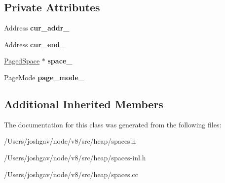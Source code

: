 \subsection*{Private Attributes}
\begin{DoxyCompactItemize}
\item 
Address {\bfseries cur\+\_\+addr\+\_\+}\hypertarget{classv8_1_1internal_1_1_heap_object_iterator_a3e323c7bdcfadd16b73f1e5f9bbefa38}{}\label{classv8_1_1internal_1_1_heap_object_iterator_a3e323c7bdcfadd16b73f1e5f9bbefa38}

\item 
Address {\bfseries cur\+\_\+end\+\_\+}\hypertarget{classv8_1_1internal_1_1_heap_object_iterator_a560cf531babdf39618105631d9c6b980}{}\label{classv8_1_1internal_1_1_heap_object_iterator_a560cf531babdf39618105631d9c6b980}

\item 
\hyperlink{classv8_1_1internal_1_1_paged_space}{Paged\+Space} $\ast$ {\bfseries space\+\_\+}\hypertarget{classv8_1_1internal_1_1_heap_object_iterator_a1e6debb8083b9994fe47565fbfbd170e}{}\label{classv8_1_1internal_1_1_heap_object_iterator_a1e6debb8083b9994fe47565fbfbd170e}

\item 
Page\+Mode {\bfseries page\+\_\+mode\+\_\+}\hypertarget{classv8_1_1internal_1_1_heap_object_iterator_a85289e54ac16f39216287ab9cf06c65a}{}\label{classv8_1_1internal_1_1_heap_object_iterator_a85289e54ac16f39216287ab9cf06c65a}

\end{DoxyCompactItemize}
\subsection*{Additional Inherited Members}


The documentation for this class was generated from the following files\+:\begin{DoxyCompactItemize}
\item 
/\+Users/joshgav/node/v8/src/heap/spaces.\+h\item 
/\+Users/joshgav/node/v8/src/heap/spaces-\/inl.\+h\item 
/\+Users/joshgav/node/v8/src/heap/spaces.\+cc\end{DoxyCompactItemize}
